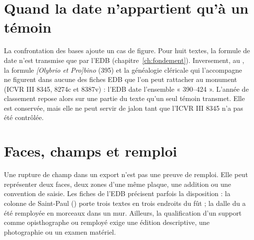\section{Quand la date n’appartient qu’à un témoin}

La confrontation des bases ajoute un cas de figure. Pour huit textes, la formule de date n’est transmise que par l’EDB (chapitre~\ref{ch:fondement}). Inversement, au , la formule \emph{[Olybrio et Pro]bino} (395) et la généalogie cléricale qui l’accompagne ne figurent dans aucune des fiches EDB que l’on peut rattacher au monument (ICVR III 8345, 8274c et 8387v) : l’EDB date l’ensemble « 390–424 ». L’année de classement repose alors sur une partie du texte qu’un seul témoin transmet. Elle est conservée, mais elle ne peut servir de jalon tant que l’ICVR III 8345 n’a pas été contrôlée.

\section{Faces, champs et remploi}

Une rupture de champ dans un export n’est pas une preuve de remploi. Elle peut représenter deux faces, deux zones d’une même plaque, une addition ou une convention de saisie. Les fiches de l’EDB précisent parfois la disposition : la colonne de Saint-Paul () porte trois textes en trois endroits du fût ; la dalle du  a été remployée en morceaux dans un mur. Ailleurs, la qualification d’un support comme opisthographe ou remployé exige une édition descriptive, une photographie ou un examen matériel.

